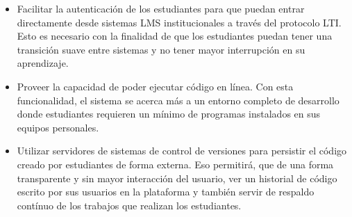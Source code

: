 \begin{itemize}
	\item Facilitar la autenticación de los estudiantes para que puedan entrar directamente desde sistemas LMS  institucionales a través del protocolo LTI. Esto es necesario con la finalidad de que los estudiantes puedan tener una transición suave entre sistemas y no tener mayor interrupción en su aprendizaje. 
	\item {} Proveer la capacidad de poder ejecutar código en línea. Con esta funcionalidad, el sistema se acerca más a un entorno completo de desarrollo donde estudiantes requieren un mínimo de programas instalados en sus equipos personales. 
	\item {} Utilizar servidores de sistemas de control de versiones para persistir el código creado por estudiantes de forma externa. Eso permitirá, que de una forma transparente y sin mayor interacción del usuario, ver un historial de código escrito por sus usuarios en la plataforma y también servir de respaldo contínuo de los trabajos que realizan los estudiantes.  
\end{itemize}

